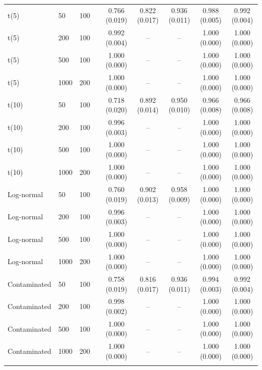 \documentclass[pdflatex,sn-mathphys-num]{sn-jnl}
\theoremstyle{thmstyleone}%
\theoremstyle{thmstyletwo}%
\theoremstyle{thmstylethree}%
\begin{document}
\begin{table}[t]
\begin{tabular}{llllccccc}
t(5) & 50 & 100 & & 0.766 (0.019) & 0.822 (0.017) & 0.936 (0.011) & 0.988 (0.005) & 0.992 (0.004) \\
t(5) & 200 & 100 & & 0.992 (0.004) & -- & -- & 1.000 (0.000) & 1.000 (0.000) \\
t(5) & 500 & 100 & & 1.000 (0.000) & -- & -- & 1.000 (0.000) & 1.000 (0.000) \\
t(5) & 1000 & 200 & & 1.000 (0.000) & -- & -- & 1.000 (0.000) & 1.000 (0.000) \\
t(10) & 50 & 100 & & 0.718 (0.020) & 0.892 (0.014) & 0.950 (0.010) & 0.966 (0.008) & 0.966 (0.008) \\
t(10) & 200 & 100 & & 0.996 (0.003) & -- & -- & 1.000 (0.000) & 1.000 (0.000) \\
t(10) & 500 & 100 & & 1.000 (0.000) & -- & -- & 1.000 (0.000) & 1.000 (0.000) \\
t(10) & 1000 & 200 & & 1.000 (0.000) & -- & -- & 1.000 (0.000) & 1.000 (0.000) \\
Log-normal & 50 & 100 & & 0.760 (0.019) & 0.902 (0.013) & 0.958 (0.009) & 1.000 (0.000) & 1.000 (0.000) \\
Log-normal & 200 & 100 & & 0.996 (0.003) & -- & -- & 1.000 (0.000) & 1.000 (0.000) \\
Log-normal & 500 & 100 & & 1.000 (0.000) & -- & -- & 1.000 (0.000) & 1.000 (0.000) \\
Log-normal & 1000 & 200 & & 1.000 (0.000) & -- & -- & 1.000 (0.000) & 1.000 (0.000) \\
Contaminated & 50 & 100 & & 0.758 (0.019) & 0.816 (0.017) & 0.936 (0.011) & 0.994 (0.003) & 0.992 (0.004) \\
Contaminated & 200 & 100 & & 0.998 (0.002) & -- & -- & 1.000 (0.000) & 1.000 (0.000) \\
Contaminated & 500 & 100 & & 1.000 (0.000) & -- & -- & 1.000 (0.000) & 1.000 (0.000) \\
Contaminated & 1000 & 200 & & 1.000 (0.000) & -- & -- & 1.000 (0.000) & 1.000 (0.000) \\
\botrule
\end{tabular}
\end{table}
\end{document}
